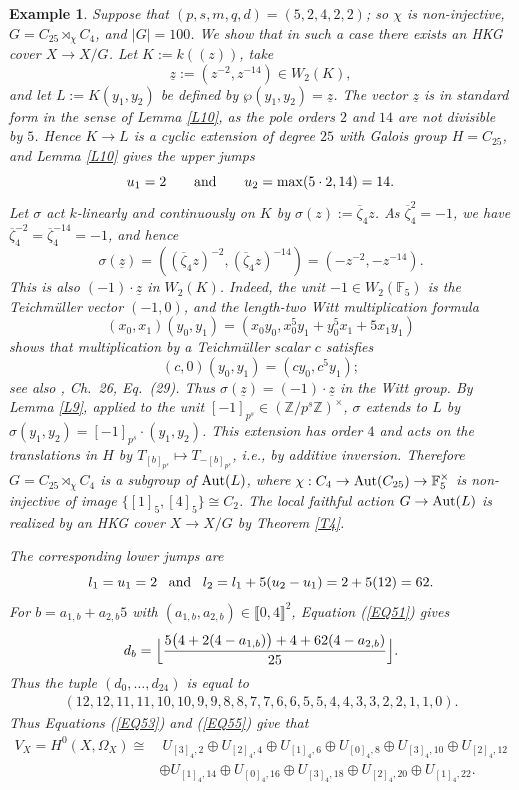 \documentclass[11pt]{amsart}
\newtheorem{ex}[theorem]{Example}
\def\Aut{\textup{Aut}}
\begin{document}
\begin{ex}\normalfont\label{EX11}
Suppose that $(p,s,m,q,d)=(5,2,4,2,2)$; so $\chi$ is non-injective, $G=C_{25}\rtimes_{\chi} C_4$, and $|G|=100$. We show that in such a case there exists an HKG cover $X\rightarrow X/G$. Let $K:=k((z))$, take
$$\underline{z}:=(z^{-2},z^{-14})\in W_2(K),$$
and let $L:=K(y_1,y_2)$ be defined by $\wp(y_1,y_2)=\underline{z}$. The vector $\underline{z}$ is in standard form in the sense of Lemma \ref{L10}, as the pole orders $2$ and $14$ are not divisible by $5$. Hence $K\rightarrow L$ is a cyclic extension of degree $25$ with Galois group $H=C_{25}$, and Lemma \ref{L10} gives the upper jumps
$$u_1=2\qquad\textup{and}\qquad u_2=\max(5\cdot 2,14)=14.$$
Let $\sigma$ act $k$-linearly and continuously on $K$ by $\sigma(z):=\overline{\zeta}_4z$.
As $\overline{\zeta}_4^2=-1$, we have
$\overline{\zeta}_4^{-2}=\overline{\zeta}_4^{-14}=-1$, and hence
$$\sigma(\underline{z})=((\overline{\zeta}_4z)^{-2},(\overline{\zeta}_4z)^{-14})=(-z^{-2},-z^{-14}).$$
This is also $(-1)\cdot\underline{z}$ in $W_2(K)$. Indeed, the unit
$-1\in W_2(\mathbb F_5)$ is the Teichm\"uller vector $(-1,0)$, and the
length-two Witt multiplication formula
\[
(x_0,x_1)(y_0,y_1)=(x_0y_0,x_0^5y_1+y_0^5x_1+5x_1y_1)
\]
shows that multiplication by a Teichm\"uller scalar $c$ satisfies
\[
(c,0)(y_0,y_1)=(cy_0,c^5y_1);
\]
see also \cite{L}, Ch.\ 26, Eq.\ (29). Thus
$\sigma(\underline{z})=(-1)\cdot\underline{z}$ in the Witt group. By Lemma \ref{L9}, applied to the unit $[-1]_{p^s}\in (\mathbb Z/p^s\mathbb Z)^{\times}$, $\sigma$ extends to $L$ by $\sigma(y_1,y_2)=[-1]_{p^s}\cdot(y_1,y_2)$. This extension has order $4$ and acts on the translations in $H$ by $T_{[b]_{p^s}}\mapsto T_{-[b]_{p^s}}$, i.e., by additive inversion. Therefore $G=C_{25}\rtimes_{\chi} C_4$ is a subgroup of $\Aut(L)$, where $\chi:C_4\rightarrow \Aut(C_{25})\rightarrow \mathbb F_5^{\times}$ is non-injective of image $\{[1]_5,[4]_5\}\cong C_2$. The local faithful action $G\rightarrow\Aut(L)$ is realized by an HKG cover $X\rightarrow X/G$ by Theorem \ref{T4}.

The corresponding lower jumps are
$$l_1=u_1=2\;\;\;\textup{and}\;\;\;l_2=l_1+5(u_2-u_1)=2+5(12)=62.$$
For $b=a_{1,b}+a_{2,b}5$ with $(a_{1,b},a_{2,b})\in\llbracket0,4\rrbracket^2$, Equation (\ref{EQ51}) gives
$$d_b=\Bigl\lfloor \frac{5\bigl(4+2(4-a_{1,b})\bigr)+4+62(4-a_{2,b})}{25}\Bigr\rfloor.$$
Thus the tuple $(d_0,\ldots,d_{24})$ is equal to
\[
\begin{aligned}
(12,12,11,11,10,10,9,9,8,8,7,7,6,6,5,5,4,4,3,3,2,2,1,1,0).
\end{aligned}
\]
Thus Equations (\ref{EQ53}) and (\ref{EQ55}) give that
\begin{align*}
V_X=H^0(X,\Omega_X)\cong &\ U_{[3]_4,2}\oplus U_{[2]_4,4}\oplus U_{[1]_4,6}\oplus U_{[0]_4,8}\oplus U_{[3]_4,10}\oplus U_{[2]_4,12}\\
&\oplus U_{[1]_4,14}\oplus U_{[0]_4,16}\oplus U_{[3]_4,18}\oplus U_{[2]_4,20}\oplus U_{[1]_4,22}.
\end{align*}


\end{ex}
\end{document}
